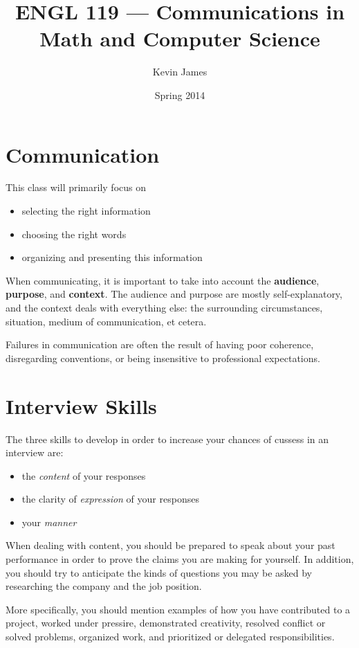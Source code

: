 \documentclass[12pt]{article}
\begin{document}
\title{ENGL 119 --- Communications in Math and Computer Science}
\author{Kevin James}
\date{\vspace{-2ex}Spring 2014}
\maketitle\HRule

\section{Communication}
This class will primarily focus on
\begin{itemize}
\item selecting the right information
\item choosing the right words
\item organizing and presenting this information
\end{itemize}

When communicating, it is important to take into account the {\bf audience}, {\bf purpose}, and {\bf context}. The audience and purpose are mostly self-explanatory, and the context deals with everything else: the surrounding circumstances, situation, medium of communication, et cetera.

Failures in communication are often the result of having poor coherence, disregarding conventions, or being insensitive to professional expectations.

\section{Interview Skills}
The three skills to develop in order to increase your chances of cussess in an interview are:
\begin{itemize}
\item the \emph{content} of your responses
\item the clarity of \emph{expression} of your responses
\item your \emph{manner}
\end{itemize}

When dealing with content, you should be prepared to speak about your past performance in order to prove the claims you are making for yourself. In addition, you should try to anticipate the kinds of questions you may be asked by researching the company and the job position.

More specifically, you should mention examples of how you have contributed to a project, worked under pressire, demonstrated creativity, resolved conflict or solved problems, organized work, and prioritized or delegated responsibilities.
\end{document}
